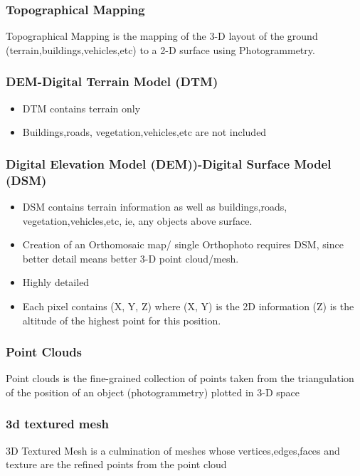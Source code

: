 \documentclass[11pt,twocolumn,letterpaper]{article}
\begin{document}
\subsubsection{Topographical Mapping}

Topographical Mapping is the mapping of the 3-D layout of the ground (terrain,buildings,vehicles,etc) to a 2-D surface using Photogrammetry.

\subsubsection{DEM-Digital Terrain Model (DTM)}
\begin{itemize}
\item DTM contains terrain only
\item  Buildings,roads, vegetation,vehicles,etc are not included
\end{itemize}

\subsubsection{Digital Elevation Model (DEM))-Digital Surface Model (DSM)}
\begin{itemize}
\item DSM contains terrain information as well as buildings,roads, vegetation,vehicles,etc, ie, any objects above surface.
\item Creation of an Orthomosaic map/ single Orthophoto requires DSM, since better detail means better 3-D point cloud/mesh.
\item Highly detailed
\item Each pixel contains (X, Y, Z) where (X, Y) is the 2D information (Z) is the altitude of the highest point for this position.
\end{itemize}

\subsubsection{Point Clouds}
Point clouds is the fine-grained collection of points taken from the triangulation of the position of an object (photogrammetry) plotted in 3-D space

\subsubsection{3d textured mesh}
3D Textured Mesh is a culmination of meshes whose vertices,edges,faces and texture are the refined points from the point cloud
\end{document}
